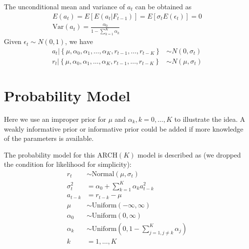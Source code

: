 \documentclass[12pt]{article}
\begin{document}
The unconditional mean and variance of $a_t$ can be obtained as
\begin{gather}
  E\left(a_t\right) = E\left[E\left(a_t \left| F_{t-1}\right.\right)\right] = E\left[\sigma_t E\left(\epsilon_t\right)\right] =0 \\
  \text{Var}\left(a_t\right) = \frac{\alpha_0}{1-\sum \limits_{k=1}^K \alpha_k}
\end{gather}
Given $\epsilon_t \sim N(0,1)$, we have
\begin{align}
  a_t\left|\left\{\mu, \alpha_0, \alpha_1, \ldots, \alpha_K, r_{t-1}, \ldots, r_{t-K}\right\}\right. &\sim N\left(0,\sigma_t\right)\\
  r_t\left|\left\{\mu, \alpha_0, \alpha_1, \ldots, \alpha_K, r_{t-1}, \ldots, r_{t-K}\right\}\right. &\sim N\left(\mu,\sigma_t\right)
\end{align}
\section{Probability Model}

Here we use an improper prior for $\mu$ and $\alpha_k, k=0,\ldots, K$ to illustrate the idea. A weakly informative prior or informative prior could be added if more knowledge of the parameters is available.

The probability model for this $\text{ARCH}(K)$ model is described as (we dropped the condition for likelihood for simplicity):
\begin{align*}
  r_t &\sim \mathrm{Normal}\left( \mu, \sigma_t \right) \\
  \sigma_t^2 &= \alpha_0 + \sum \limits_{k=1}^K \alpha_k a_{t-k}^2 \\
  a_{t-k} &= r_{t-k} - \mu \\  
  \mu &\sim \mathrm{Uniform}\left( -\infty,\infty \right) \\
  \alpha_0 &\sim \mathrm{Uniform}\left( 0,\infty \right) \\
  \alpha_k &\sim \mathrm{Uniform}\left( 0, 1-\sum \limits_{j=1,j\neq k}^K \alpha_j \right) \\
  k &= 1,\ldots, K
\end{align*}


\end{document}
